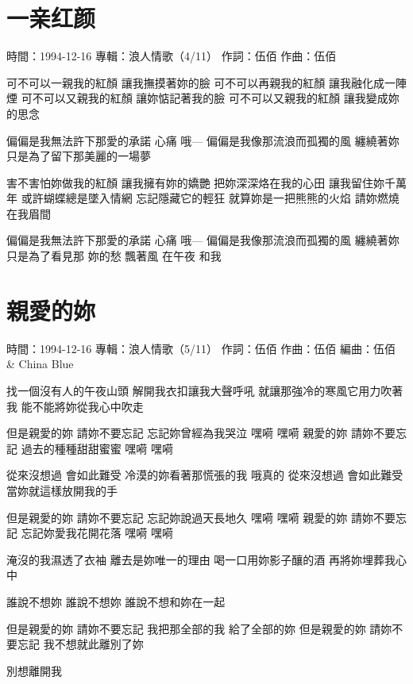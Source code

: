 \documentclass[UTF8,a4paper,oneside,twocolumn,12pt]{ctexbook}
\newcommand{\infopair}[2]{\textbullet #1：#2}
\newcommand{\zc}[1][伍佰]{\infopair{作詞}{#1}}
\newcommand{\zq}[1][伍佰]{\infopair{作曲}{#1}}
\newcommand{\bq}[1][伍佰]{\infopair{編曲}{#1}}
\newcommand{\zj}[1]{\infopair{專輯}{#1}}
\newcommand{\sj}[1]{\infopair{時間}{#1}}
\newenvironment{info}{\begin{flushleft}\kaishu
	}
	{\end{flushleft}\normalsize\yahei\par}
\newenvironment{lyric}{
	}
{}
\begin{document}
\section{一亲红颜}
\begin{info}
	\sj{1994-12-16}
	\zj{浪人情歌（4/11）}
	\zc
	\zq
\end{info}
\begin{lyric}
	可不可以一親我的紅顏 讓我撫摸著妳的臉
	可不可以再親我的紅顏 讓我融化成一陣煙
	可不可以又親我的紅顏 讓妳惦記著我的臉
	可不可以又親我的紅顏 讓我變成妳的思念

	偏偏是我無法許下那愛的承諾 心痛 哦---
	偏偏是我像那流浪而孤獨的風
	纏繞著妳只是為了留下那美麗的一場夢

	害不害怕妳做我的紅顏 讓我擁有妳的嬌艷
	把妳深深烙在我的心田 讓我留住妳千萬年
	或許蝴蝶總是墜入情網 忘記隱藏它的輕狂
	就算妳是一把熊熊的火焰 請妳燃燒在我眉間

	偏偏是我無法許下那愛的承諾 心痛 哦---
	偏偏是我像那流浪而孤獨的風
	纏繞著妳只是為了看見那
	妳的愁 飄著風 在午夜 和我
\end{lyric}

\section{親愛的妳}
\begin{info}
	\sj{1994-12-16}
	\zj{浪人情歌（5/11）}
	\zc
	\zq
	\bq[伍佰 \& China Blue]
\end{info}
\begin{lyric}
	找一個沒有人的午夜山頭
	解開我衣扣讓我大聲呼吼
	就讓那強冷的寒風它用力吹著我
	能不能將妳從我心中吹走

	但是親愛的妳 請妳不要忘記
	忘記妳曾經為我哭泣 嘿嗬 嘿嗬
	親愛的妳 請妳不要忘記
	過去的種種甜甜蜜蜜 嘿嗬 嘿嗬

	從來沒想過 會如此難受
	冷漠的妳看著那慌張的我
	哦真的 從來沒想過 會如此難受
	當妳就這樣放開我的手

	但是親愛的妳 請妳不要忘記
	忘記妳說過天長地久 嘿嗬 嘿嗬
	親愛的妳 請妳不要忘記
	忘記妳愛我花開花落 嘿嗬 嘿嗬

	淹沒的我濕透了衣袖
	離去是妳唯一的理由
	喝一口用妳影子釀的酒
	再將妳埋葬我心中

	誰說不想妳
	誰說不想妳
	誰說不想和妳在一起

	但是親愛的妳 請妳不要忘記
	我把那全部的我 給了全部的妳
	但是親愛的妳 請妳不要忘記
	我不想就此離別了妳

	別想離開我
\end{lyric}
\end{document}
